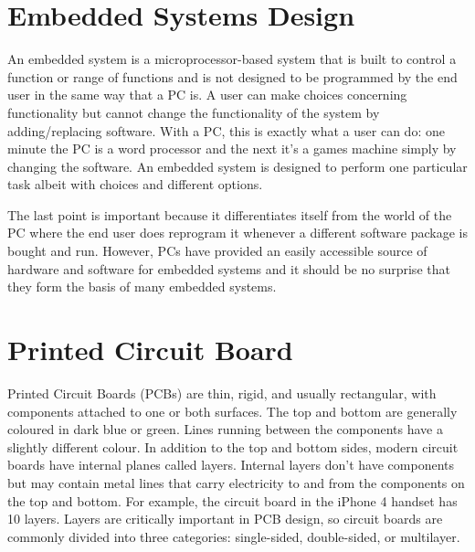 \section{Embedded Systems Design} 


An embedded system is a microprocessor-based system
that is built to control a function or range of functions and is not designed to be
programmed by the end user in the same way that a PC is. A user can make choices
concerning functionality but cannot change the functionality of the system by
adding/replacing software. With a PC, this is exactly what a user can do: one minute
the PC is a word processor and the next it's a games machine simply by changing the
software. An embedded system is designed to perform one particular task albeit with
choices and different options.

The last point is important because it differentiates itself from the world of the PC
where the end user does reprogram it whenever a different software package is bought
and run. However, PCs have provided an easily accessible source of hardware and
software for embedded systems and it should be no surprise that they form the basis
of many embedded systems.

\section{Printed Circuit Board} 

Printed Circuit Boards (PCBs) are thin, rigid, and usually rectangular, with
components attached to one or both surfaces. The top and bottom are generally
coloured in dark blue or green. Lines running between the components have a slightly
different colour. In addition to the top and bottom sides, modern circuit boards have
internal planes called layers. Internal layers don’t have components but may contain
metal lines that carry electricity to and from the components on the top and bottom.
For example, the circuit board in the iPhone 4 handset has 10 layers. Layers are
critically important in PCB design, so circuit boards are commonly divided into three
categories: single-sided, double-sided, or multilayer. 

%
%
%
%
%
%


